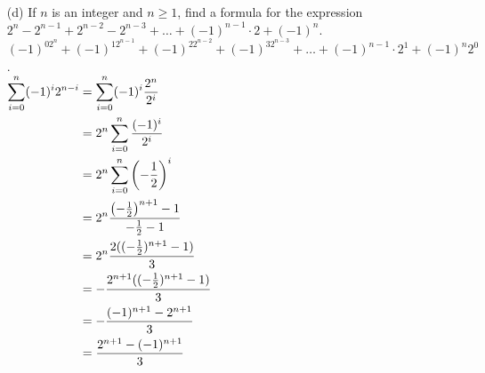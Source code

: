\documentclass[letterpaper,fleqn,leqno]{article}
\begin{document}
\begin{enumerate}[(a)]
{\begin{enumerate}
				\item [(d)]
				If $n$ is an integer and $n\geq1$, find a formula for the expression \\
				$2^n-2^{n-1}+2^{n-2}-2^{n-3}+\dots+(-1)^{n-1}\cdot2+(-1)^n$. \\
				$(-1)^02^n+(-1)^12^{n-1}+(-1)^22^{n-2}+(-1)^32^{n-3}+\dots+(-1)^{n-1}\cdot2^1+(-1)^n2^0$. \\
				$\begin{aligned}[t]
					\displaystyle\sum\limits_{i=0}^{n}(-1)^i2^{n-i} &= \displaystyle\sum\limits_{i=0}^{n}(-1)^i\dfrac{2^n}{2^i} \\
					&= 2^n\displaystyle\sum\limits_{i=0}^{n}\dfrac{(-1)^i}{2^i} \\
					&= 2^n\displaystyle\sum\limits_{i=0}^{n}\left(-\dfrac{1}{2}\right)^i \\
					&= 2^n\dfrac{\left(-\frac{1}{2}\right)^{n+1}-1}{-\frac{1}{2}-1} \\
					&= 2^n\dfrac{2((-\frac{1}{2})^{n+1}-1)}{3} \\
					&= -\dfrac{2^{n+1}((-\frac{1}{2})^{n+1}-1)}{3} \\
					&= -\dfrac{(-1)^{n+1}-2^{n+1}}{3} \\
					&= \dfrac{2^{n+1}-(-1)^{n+1}}{3} \\
				\end{aligned}$ \\
			\end{enumerate}
		}
\end{enumerate}
\end{document}
